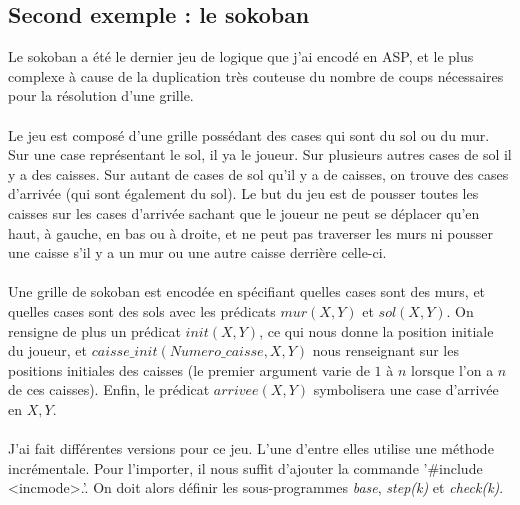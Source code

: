 \documentclass[12pt,a4paper]{article}
\begin{document}
\subsection{Second exemple : le sokoban}
Le sokoban a été le dernier jeu de logique que j'ai encodé en ASP, et le plus complexe à cause de la duplication très couteuse du nombre de coups nécessaires pour la résolution d'une grille.\\ \\
Le jeu est composé d'une grille possédant des cases qui sont du sol ou du mur. Sur une case représentant le sol, il ya le joueur. Sur plusieurs autres cases de sol il y a des caisses. Sur autant de cases de sol qu'il y a de caisses, 
on trouve des cases d'arrivée (qui sont également du sol). Le but du jeu est de pousser toutes les caisses sur les cases d'arrivée sachant que le joueur ne peut se déplacer qu'en haut, à gauche, en bas ou à droite, et ne peut pas 
traverser les murs ni pousser une caisse s'il y a un mur ou une autre caisse derrière celle-ci.\\ \\
Une grille de sokoban est encodée en spécifiant quelles cases sont des murs, et quelles cases sont des sols avec les prédicats $mur(X,Y)$ et $sol(X,Y)$. On rensigne de plus un prédicat $init(X,Y)$, ce qui nous donne la position 
initiale du joueur, et $caisse\_init(Numero\_caisse,X,Y)$ nous renseignant sur les positions initiales des caisses (le premier argument varie de $1$ à $n$ lorsque l'on a $n$ de ces caisses). Enfin, le prédicat $arrivee(X,Y)$ 
symbolisera une case d'arrivée en $X,Y$.\\ \\
J'ai fait différentes versions pour ce jeu. L'une d'entre elles utilise une méthode incrémentale. Pour l'importer, il nous suffit d'ajouter la commande '\#include \textless incmode\textgreater .'. On doit alors définir les 
sous-programmes \emph{base}, \emph{step(k)} et \emph{check(k)}.\\
\end{document}
